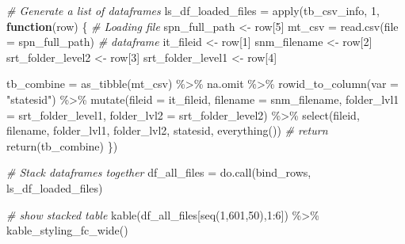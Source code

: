 \documentclass[
]{book}
\newenvironment{Shaded}{\begin{snugshade}}{\end{snugshade}}
\newcommand{\AttributeTok}[1]{\textcolor[rgb]{0.77,0.63,0.00}{#1}}
\newcommand{\CommentTok}[1]{\textcolor[rgb]{0.56,0.35,0.01}{\textit{#1}}}
\newcommand{\ControlFlowTok}[1]{\textcolor[rgb]{0.13,0.29,0.53}{\textbf{#1}}}
\newcommand{\DecValTok}[1]{\textcolor[rgb]{0.00,0.00,0.81}{#1}}
\newcommand{\FunctionTok}[1]{\textcolor[rgb]{0.00,0.00,0.00}{#1}}
\newcommand{\NormalTok}[1]{#1}
\newcommand{\OtherTok}[1]{\textcolor[rgb]{0.56,0.35,0.01}{#1}}
\newcommand{\SpecialCharTok}[1]{\textcolor[rgb]{0.00,0.00,0.00}{#1}}
\newcommand{\StringTok}[1]{\textcolor[rgb]{0.31,0.60,0.02}{#1}}
\begin{document}
\begin{Shaded}
\begin{Highlighting}[]
\CommentTok{\# Generate a list of dataframes}
\NormalTok{ls\_df\_loaded\_files }\OtherTok{=}
  \FunctionTok{apply}\NormalTok{(tb\_csv\_info,}
        \DecValTok{1}\NormalTok{,}
        \ControlFlowTok{function}\NormalTok{(row) \{}
          \CommentTok{\# Loading file}
\NormalTok{          spn\_full\_path }\OtherTok{\textless{}{-}}\NormalTok{ row[}\DecValTok{5}\NormalTok{]}
\NormalTok{          mt\_csv }\OtherTok{=} \FunctionTok{read.csv}\NormalTok{(}\AttributeTok{file =}\NormalTok{ spn\_full\_path)}
          \CommentTok{\# dataframe}
\NormalTok{          it\_fileid }\OtherTok{\textless{}{-}}\NormalTok{ row[}\DecValTok{1}\NormalTok{]}
\NormalTok{          snm\_filename }\OtherTok{\textless{}{-}}\NormalTok{ row[}\DecValTok{2}\NormalTok{]}
\NormalTok{          srt\_folder\_level2 }\OtherTok{\textless{}{-}}\NormalTok{ row[}\DecValTok{3}\NormalTok{]}
\NormalTok{          srt\_folder\_level1 }\OtherTok{\textless{}{-}}\NormalTok{ row[}\DecValTok{4}\NormalTok{]}

\NormalTok{          tb\_combine }\OtherTok{=} \FunctionTok{as\_tibble}\NormalTok{(mt\_csv) }\SpecialCharTok{\%\textgreater{}\%}
\NormalTok{            na.omit }\SpecialCharTok{\%\textgreater{}\%}
            \FunctionTok{rowid\_to\_column}\NormalTok{(}\AttributeTok{var =} \StringTok{"statesid"}\NormalTok{) }\SpecialCharTok{\%\textgreater{}\%}
            \FunctionTok{mutate}\NormalTok{(}\AttributeTok{fileid =}\NormalTok{ it\_fileid,}
                   \AttributeTok{filename =}\NormalTok{ snm\_filename,}
                   \AttributeTok{folder\_lvl1 =}\NormalTok{ srt\_folder\_level1,}
                   \AttributeTok{folder\_lvl2 =}\NormalTok{ srt\_folder\_level2) }\SpecialCharTok{\%\textgreater{}\%}
            \FunctionTok{select}\NormalTok{(fileid, filename, folder\_lvl1, folder\_lvl2,}
\NormalTok{                   statesid, }\FunctionTok{everything}\NormalTok{())}
          \CommentTok{\# return}
          \FunctionTok{return}\NormalTok{(tb\_combine)}
\NormalTok{        \})}

\CommentTok{\# Stack dataframes together}
\NormalTok{df\_all\_files }\OtherTok{=} \FunctionTok{do.call}\NormalTok{(bind\_rows, ls\_df\_loaded\_files)}

\CommentTok{\# show stacked table}
\FunctionTok{kable}\NormalTok{(df\_all\_files[}\FunctionTok{seq}\NormalTok{(}\DecValTok{1}\NormalTok{,}\DecValTok{601}\NormalTok{,}\DecValTok{50}\NormalTok{),}\DecValTok{1}\SpecialCharTok{:}\DecValTok{6}\NormalTok{]) }\SpecialCharTok{\%\textgreater{}\%} \FunctionTok{kable\_styling\_fc\_wide}\NormalTok{()}
\end{Highlighting}
\end{Shaded}
\end{document}

